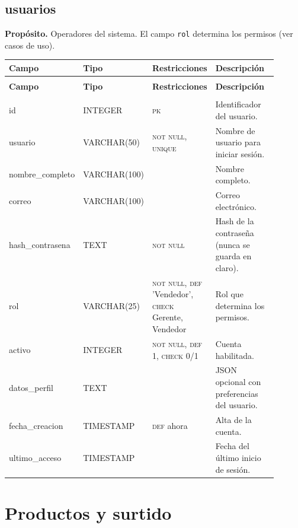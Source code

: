 \documentclass[11pt]{article}
\makeatletter
\newenvironment{campos}{%
  \par\footnotesize
  \setlength{\LTpre}{0.3ex}\setlength{\LTpost}{0.6ex}
  \begin{longtable}{@{}>{\ttfamily}p{0.165\linewidth} >{\ttfamily}p{0.150\linewidth} p{0.205\linewidth} >{\raggedright\arraybackslash}p{0.385\linewidth}@{}}
  \toprule
  \normalfont\bfseries Campo & \normalfont\bfseries Tipo & \normalfont\bfseries Restricciones & \normalfont\bfseries Descripción \\
  \midrule \endfirsthead
  \multicolumn{4}{@{}l}{\footnotesize\itshape \dots\ continuación}\\[0.3ex]
  \toprule
  \normalfont\bfseries Campo & \normalfont\bfseries Tipo & \normalfont\bfseries Restricciones & \normalfont\bfseries Descripción \\
  \midrule \endhead
  \midrule \multicolumn{4}{r@{}}{\footnotesize\itshape continúa en la siguiente página}\\ \endfoot
  \bottomrule \endlastfoot
}{%
  \end{longtable}\par
}
\newcommand{\proposito}[1]{\par\vspace{0.2ex}\noindent\colorbox{brandlight}{\parbox{\dimexpr\linewidth-2\fboxsep}{\small\textbf{Propósito.} #1}}\par\vspace{0.8ex}}
\newcommand{\pk}{\textsc{pk}}
\newcommand{\nn}{\textsc{not null}}
\newcommand{\uq}{\textsc{unique}}
\makeatother
\begin{document}
\subsection{usuarios}
\proposito{Operadores del sistema. El campo \texttt{rol} determina los permisos (ver casos de uso).}
\begin{campos}
id              & INTEGER     & \pk{}     & Identificador del usuario. \\
usuario         & VARCHAR(50) & \nn, \uq  & Nombre de usuario para iniciar sesión. \\
nombre\_completo & VARCHAR(100) &          & Nombre completo. \\
correo          & VARCHAR(100) &           & Correo electrónico. \\
hash\_contrasena & TEXT        & \nn       & Hash de la contraseña (nunca se guarda en claro). \\
rol             & VARCHAR(25) & \nn, \textsc{def} 'Vendedor', \textsc{check} Gerente, Vendedor & Rol que determina los permisos. \\
activo          & INTEGER     & \nn, \textsc{def} 1, \textsc{check} 0/1 & Cuenta habilitada. \\
datos\_perfil   & TEXT        &           & JSON opcional con preferencias del usuario. \\
fecha\_creacion & TIMESTAMP   & \textsc{def} ahora & Alta de la cuenta. \\
ultimo\_acceso  & TIMESTAMP   &           & Fecha del último inicio de sesión. \\
\end{campos}

\section{Productos y surtido}
\end{document}

